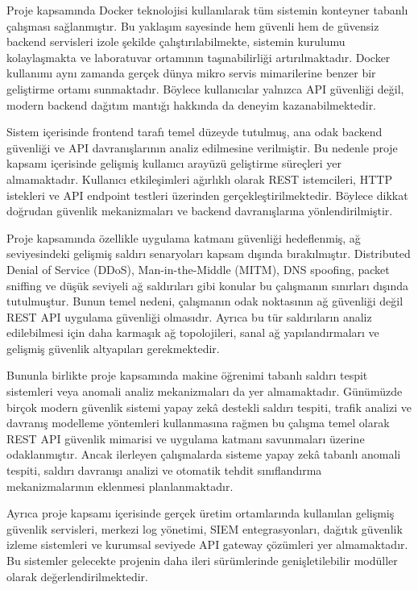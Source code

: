 Proje kapsamında Docker teknolojisi kullanılarak tüm sistemin konteyner tabanlı çalışması sağlanmıştır. Bu yaklaşım sayesinde hem güvenli hem de güvensiz backend servisleri izole şekilde çalıştırılabilmekte, sistemin kurulumu kolaylaşmakta ve laboratuvar ortamının taşınabilirliği artırılmaktadır. Docker kullanımı aynı zamanda gerçek dünya mikro servis mimarilerine benzer bir geliştirme ortamı sunmaktadır. Böylece kullanıcılar yalnızca API güvenliği değil, modern backend dağıtım mantığı hakkında da deneyim kazanabilmektedir.

Sistem içerisinde frontend tarafı temel düzeyde tutulmuş, ana odak backend güvenliği ve API davranışlarının analiz edilmesine verilmiştir. Bu nedenle proje kapsamı içerisinde gelişmiş kullanıcı arayüzü geliştirme süreçleri yer almamaktadır. Kullanıcı etkileşimleri ağırlıklı olarak REST istemcileri, HTTP istekleri ve API endpoint testleri üzerinden gerçekleştirilmektedir. Böylece dikkat doğrudan güvenlik mekanizmaları ve backend davranışlarına yönlendirilmiştir.

Proje kapsamında özellikle uygulama katmanı güvenliği hedeflenmiş, ağ seviyesindeki gelişmiş saldırı senaryoları kapsam dışında bırakılmıştır. Distributed Denial of Service (DDoS), Man-in-the-Middle (MITM), DNS spoofing, packet sniffing ve düşük seviyeli ağ saldırıları gibi konular bu çalışmanın sınırları dışında tutulmuştur. Bunun temel nedeni, çalışmanın odak noktasının ağ güvenliği değil REST API uygulama güvenliği olmasıdır. Ayrıca bu tür saldırıların analiz edilebilmesi için daha karmaşık ağ topolojileri, sanal ağ yapılandırmaları ve gelişmiş güvenlik altyapıları gerekmektedir.

Bununla birlikte proje kapsamında makine öğrenimi tabanlı saldırı tespit sistemleri veya anomali analiz mekanizmaları da yer almamaktadır. Günümüzde birçok modern güvenlik sistemi yapay zekâ destekli saldırı tespiti, trafik analizi ve davranış modelleme yöntemleri kullanmasına rağmen bu çalışma temel olarak REST API güvenlik mimarisi ve uygulama katmanı savunmaları üzerine odaklanmıştır. Ancak ilerleyen çalışmalarda sisteme yapay zekâ tabanlı anomali tespiti, saldırı davranışı analizi ve otomatik tehdit sınıflandırma mekanizmalarının eklenmesi planlanmaktadır.

Ayrıca proje kapsamı içerisinde gerçek üretim ortamlarında kullanılan gelişmiş güvenlik servisleri, merkezi log yönetimi, SIEM entegrasyonları, dağıtık güvenlik izleme sistemleri ve kurumsal seviyede API gateway çözümleri yer almamaktadır. Bu sistemler gelecekte projenin daha ileri sürümlerinde genişletilebilir modüller olarak değerlendirilmektedir.

